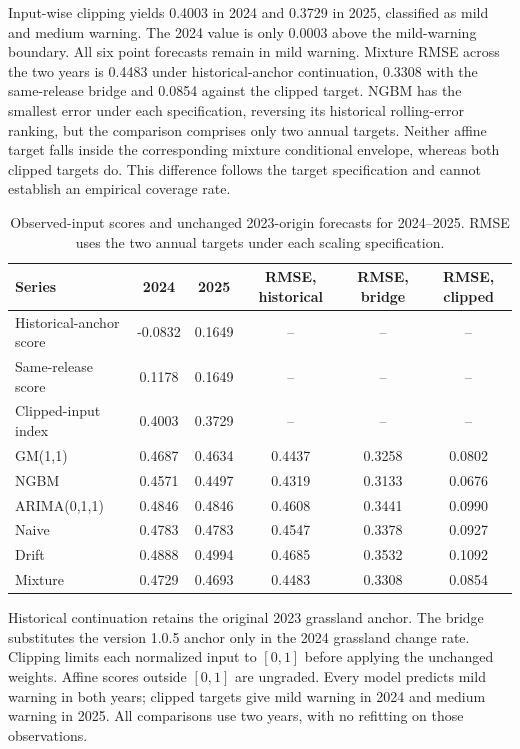 \documentclass[preprint,11pt,authoryear]{elsarticle}
\begin{document}
Input-wise clipping yields 0.4003 in 2024 and 0.3729 in 2025, classified as mild and medium warning. The 2024 value is only 0.0003 above the mild-warning boundary. All six point forecasts remain in mild warning. Mixture RMSE across the two years is 0.4483 under historical-anchor continuation, 0.3308 with the same-release bridge and 0.0854 against the clipped target. NGBM has the smallest error under each specification, reversing its historical rolling-error ranking, but the comparison comprises only two annual targets. Neither affine target falls inside the corresponding mixture conditional envelope, whereas both clipped targets do. This difference follows the target specification and cannot establish an empirical coverage rate.

\begin{table}[htbp]
\centering
\caption{Observed-input scores and unchanged 2023-origin forecasts for 2024--2025. RMSE uses the two annual targets under each scaling specification.}
\label{tab:observed-validation}
\footnotesize
\setlength{\tabcolsep}{3pt}
\begin{tabular}{lccccc}
\toprule
Series & 2024 & 2025 & RMSE, historical & RMSE, bridge & RMSE, clipped \\
\midrule
Historical-anchor score & -0.0832 & 0.1649 & -- & -- & -- \\
Same-release score & 0.1178 & 0.1649 & -- & -- & -- \\
Clipped-input index & 0.4003 & 0.3729 & -- & -- & -- \\
\midrule
GM(1,1) & 0.4687 & 0.4634 & 0.4437 & 0.3258 & 0.0802 \\
NGBM & 0.4571 & 0.4497 & 0.4319 & 0.3133 & 0.0676 \\
ARIMA(0,1,1) & 0.4846 & 0.4846 & 0.4608 & 0.3441 & 0.0990 \\
Naive & 0.4783 & 0.4783 & 0.4547 & 0.3378 & 0.0927 \\
Drift & 0.4888 & 0.4994 & 0.4685 & 0.3532 & 0.1092 \\
Mixture & 0.4729 & 0.4693 & 0.4483 & 0.3308 & 0.0854 \\
\bottomrule
\end{tabular}

\vspace{2pt}
{\scriptsize Historical continuation retains the original 2023 grassland anchor. The bridge substitutes the version 1.0.5 anchor only in the 2024 grassland change rate. Clipping limits each normalized input to $[0,1]$ before applying the unchanged weights. Affine scores outside $[0,1]$ are ungraded. Every model predicts mild warning in both years; clipped targets give mild warning in 2024 and medium warning in 2025. All comparisons use two years, with no refitting on those observations.}
\end{table}
\end{document}
